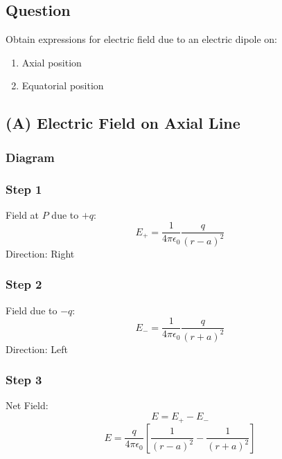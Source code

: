 \documentclass[11pt,a4paper]{article}
\begin{document}
\subsection*{Question}
Obtain expressions for electric field due to an electric dipole on:
\begin{enumerate}
    \item Axial position
    \item Equatorial position
\end{enumerate}

\subsection*{(A) Electric Field on Axial Line}
\subsubsection*{Diagram}
\begin{center}
\end{center}

\subsubsection*{Step 1}
Field at \( P \) due to \( +q \):
\[ E_+ = \frac{1}{4\pi\epsilon_0} \frac{q}{(r-a)^2} \]
Direction: Right

\subsubsection*{Step 2}
Field due to \( -q \):
\[ E_- = \frac{1}{4\pi\epsilon_0} \frac{q}{(r+a)^2} \]
Direction: Left

\subsubsection*{Step 3}
Net Field:
\[ E = E_+ - E_- \]
\[ E = \frac{q}{4\pi\epsilon_0} \left[ \frac{1}{(r-a)^2} - \frac{1}{(r+a)^2} \right] \]
\end{document}
